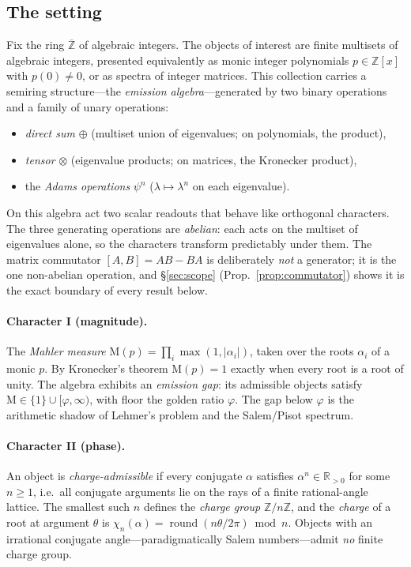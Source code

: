 \documentclass[11pt]{article}
\theoremstyle{definition}
\theoremstyle{remark}
\newcommand{\Mah}{\mathrm{M}}
\newcommand{\Z}{\mathbb{Z}}
\newcommand{\R}{\mathbb{R}}
\newcommand{\Adams}[1]{\psi^{#1}}
\newcommand{\gold}{\varphi}
\newcommand{\dsum}{\oplus}
\newcommand{\tens}{\otimes}
\newcommand{\Zmod}[1]{\Z/#1\Z}
\begin{document}
\subsection{The setting}
Fix the ring $\overline{\Z}$ of algebraic integers. The objects of interest are finite
multisets of algebraic integers, presented equivalently as monic integer polynomials
$p\in\Z[x]$ with $p(0)\neq0$, or as spectra of integer matrices. This collection carries a
semiring structure---the \emph{emission algebra}---generated by two binary operations and a
family of unary operations:
\begin{itemize}[nosep]
  \item \emph{direct sum} $\dsum$ (multiset union of eigenvalues; on polynomials, the product),
  \item \emph{tensor} $\tens$ (eigenvalue products; on matrices, the Kronecker product),
  \item the \emph{Adams operations} $\Adams n$ ($\lambda\mapsto\lambda^{n}$ on each eigenvalue).
\end{itemize}
On this algebra act two scalar readouts that behave like orthogonal characters. The three
generating operations are \emph{abelian}: each acts on the multiset of eigenvalues alone, so
the characters transform predictably under them. The matrix commutator $[A,B]=AB-BA$ is
deliberately \emph{not} a generator; it is the one non-abelian operation, and \S\ref{sec:scope}
(Prop.~\ref{prop:commutator}) shows it is the exact boundary of every result below.

\paragraph{Character I (magnitude).} The \emph{Mahler measure}
$\Mah(p)=\prod_{i}\max(1,|\alpha_i|)$, taken over the roots $\alpha_i$ of a monic $p$.
By Kronecker's theorem $\Mah(p)=1$ exactly when every root is a root of unity. The algebra
exhibits an \emph{emission gap}: its admissible objects satisfy
$\Mah\in\{1\}\cup[\gold,\infty)$, with floor the golden ratio $\gold$. The gap below $\gold$
is the arithmetic shadow of Lehmer's problem and the Salem/Pisot spectrum.

\paragraph{Character II (phase).} An object is \emph{charge-admissible} if every conjugate
$\alpha$ satisfies $\alpha^{n}\in\R_{>0}$ for some $n\ge1$, i.e.\ all conjugate arguments lie
on the rays of a finite rational-angle lattice. The smallest such $n$ defines the
\emph{charge group} $\Zmod n$, and the \emph{charge} of a root at argument $\theta$ is
$\chi_n(\alpha)=\operatorname{round}(n\theta/2\pi)\bmod n$. Objects with an irrational
conjugate angle---paradigmatically Salem numbers---admit \emph{no} finite charge group.
\end{document}

